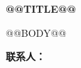 \documentclass[UTF8,zihao=-4,fontset=none]{ctexart}
\begin{document}
\begin{center}
  {\bfseries @@TITLE@@}
\end{center}
\vspace{1em}

\noindent{}

@@BODY@@

\vspace{1em}
\noindent\textbf{联系人：}
\end{document}
